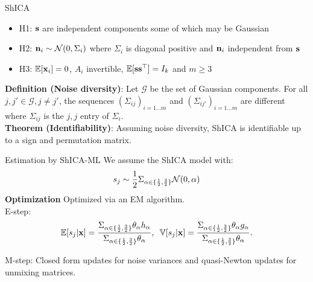 \documentclass[final]{beamer}
\newlength{\onecolwid}
\newlength{\onecolwidone}
\begin{document}
\begin{frame}[t]
\begin{columns}[t]
\begin{column}{\onecolwidone}
\begin{block}{ShICA}
      \begin{itemize}
      \item H1: $\mathbf{s}$ are independent components some of which may be Gaussian
      \item H2: $\mathbf{n}_i \sim \mathcal{N}(0, \Sigma_i)$ where $\Sigma_i$ is diagonal
        positive and $\mathbf{n}_i$ independent from $\mathbf{s}$
      \item H3: $\mathbb{E}[\mathbf{x}_i] = 0$, $A_i$ invertible, $\mathbb{E}[\mathbf{s} \mathbf{s}^{\top}] = I_k$ and $m \geq 3$
      \end{itemize}

      \vspace{0.5em}
      \textbf{Definition (Noise diversity)}: Let $\mathcal{G}$ be the set of
      Gaussian components. For all $j, j'  \in \mathcal{G}, j \neq j'$, the
      sequences $(\Sigma_{ij})_{i=1 \dots m}$ and $(\Sigma_{ij'})_{i=1 \dots m}$
      are different where $\Sigma_{ij}$ is the $j, j$ entry of $\Sigma_i$. \\
      \vspace{0.5em}
      \textbf{Theorem (Identifiability)}: 
      Assuming noise diversity, ShICA is identifiable up to a sign and permutation matrix.
    \end{block}

      
      \begin{block}{Estimation by ShICA-ML}
        We assume the ShICA model with:
        \begin{equation*} s_j \sim \frac12 \Sigma_{\alpha \in \{ \frac12, \frac32 \}} \mathcal{N}(0,
        \alpha)\end{equation*}
        \textbf{Optimization} Optimized via an EM algorithm. \\
        E-step: 
        \begin{equation*}
        \mathbb{E}[s_j | \mathbf{x}] = \frac{\Sigma_{\alpha \in \{\frac12, \frac32\}}
          \theta_{\alpha} h_{\alpha}}{\Sigma_{\alpha \in \{ \frac12, \frac32 \}}
          \theta_{\alpha}}, \enspace
        \mathbb{V}[s_j | \mathbf{x}] = \frac{\Sigma_{\alpha \in \{\frac12, \frac32\}}
          \theta_{\alpha} g_{\alpha}}{\Sigma_{\alpha \in \{ \frac12, \frac32 \}}
          \theta_{\alpha}}.
        \end{equation*}

        M-step: Closed form updates for noise variances and quasi-Newton updates for
        unmixing matrices.

      \end{block}



\end{column}
\end{columns}
\end{frame}
\end{document}
